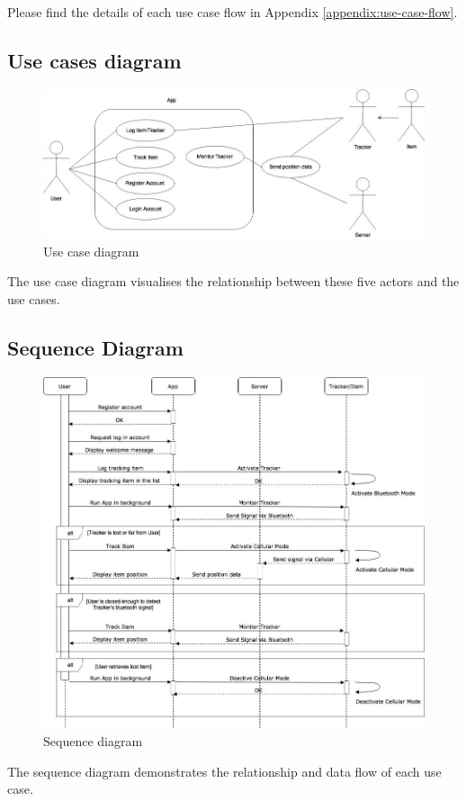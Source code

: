 \documentclass[12pt,a4paper]{article}
\begin{document}
        \paragraph{}
          Please find the details of each use case flow in Appendix \ref{appendix:use-case-flow}.
          
        \subsection{Use cases diagram}
          \begin{figure}[H]
            \centering
            \includegraphics[width=1\textwidth]{../assets/5-use-case-diagram.jpg}
            \caption{Use case diagram}
            \label{fig:Use case diagram}
          \end{figure}
          The use case diagram visualises the relationship between these five actors and the use cases.

        \subsection{Sequence Diagram}
          \begin{figure}[H]
            \centering
            \includegraphics[width=1\textwidth]{../assets/5-sequence-diagram.jpg}
            \caption{Sequence diagram}
            \label{fig:Sequence diagram}
          \end{figure}
          The sequence diagram demonstrates the relationship and data flow of each use case.
\end{document}
